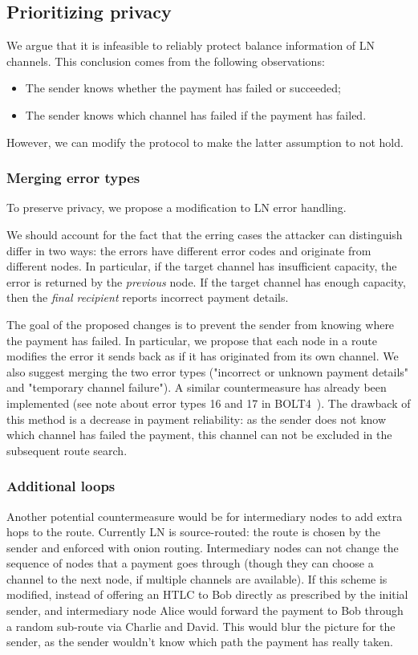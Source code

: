 \subsection{Prioritizing privacy}
We argue that it is infeasible to reliably protect balance information of LN channels.
This conclusion comes from the following observations:
\begin{itemize}
	\item The sender knows whether the payment has failed or succeeded;
	\item The sender knows which channel has failed if the payment has failed.
\end{itemize}

However, we can modify the protocol to make the latter assumption to not hold.

\subsubsection{Merging error types}
To preserve privacy, we propose a modification to LN error handling.

We should account for the fact that the erring cases the attacker can distinguish differ in two ways: the errors have different error codes and originate from different nodes.
In particular, if the target channel has insufficient capacity, the error is returned by the \textit{previous} node.
If the target channel has enough capacity, then the \textit{final recipient} reports incorrect payment details.

The goal of the proposed changes is to prevent the sender from knowing where the payment has failed.
In particular, we propose that each node in a route modifies the error it sends back as if it has originated from its own channel.
We also suggest merging the two error types ("incorrect or unknown payment details" and "temporary channel failure").
A similar countermeasure has already been implemented (see note about error types 16 and 17 in BOLT4~\cite{Bolt4OnionRouting}).
The drawback of this method is a decrease in payment reliability: as the sender does not know which channel has failed the payment, this channel can not be excluded in the subsequent route search.

\subsubsection{Additional loops}
Another potential countermeasure would be for intermediary nodes to add extra hops to the route.
Currently LN is source-routed: the route is chosen by the sender and enforced with onion routing.
Intermediary nodes can not change the sequence of nodes that a payment goes through (though they can choose a channel to the next node, if multiple channels are available).
If this scheme is modified, instead of offering an HTLC to Bob directly as prescribed by the initial sender, and intermediary node Alice would forward the payment to Bob through a random sub-route via Charlie and David.
This would blur the picture for the sender, as the sender wouldn't know which path the payment has really taken.


